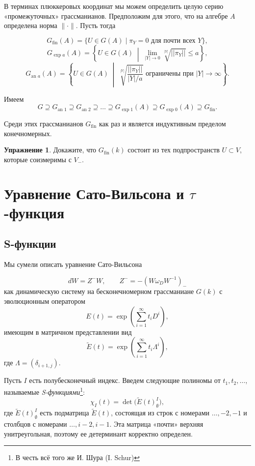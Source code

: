 \documentclass{article}
\theoremstyle{definition}
\theoremstyle{definition} %
\theoremstyle{remark}     %
\theoremstyle{definition}
\theoremstyle{definition}
\theoremstyle{definition}
\theoremstyle{definition}
\theoremstyle{definition}
\theoremstyle{definition}
\theoremstyle{definition}
\theoremstyle{definition}
\newtheorem{exercise}{Упражнение}[section]
\begin{document}
В терминах плюккеровых координат мы можем определить целую серию «промежуточных» грассманианов. Предположим для этого, что на алгебре \(A\) определена норма \(\|\cdot\|\). Пусть тогда

\[
G_{\text{fin}}(A) = \{U \in G(A) \mid \pi_Y = 0 \text{ для почти всех } Y\},
\]
\[
    G_{\exp a}(A) = \left\{U \in G(A) \;\middle|\; \lim_{|Y| \to 0} \sqrt[|Y|]{||\pi_Y||} \leq a\right\},
\]
\[
    G_{\text{an } a}(A) = \left\{U \in G(A) \;\middle|\; \sqrt[|Y|]{\frac{||\pi_Y||}{|Y|/a}} \text{ ограничены при } |Y| \to \infty\right\}.
\]

Имеем
\[
G \supseteq G_{\text{an } 1} \supseteq G_{\text{an } 2} \supseteq \dots \supseteq G_{\exp 1}(A) \supseteq G_{\exp 0}(A) \supseteq G_{\text{fin}}.
\]

Среди этих грассманианов \(G_{\text{fin}}\) как раз и является индуктивным пределом конечномерных.


\begin{exercise}
  Докажите, что \( G_{\text{fin}}(k) \) состоит из тех подпространств \( U \subset V \), которые соизмеримы с \( V_- \).
\end{exercise}


\section{Уравнение Сато-Вильсона и $\tau$-функция}
\subsection{S-функции}
Мы сумели описать уравнение Сато-Вильсона

\[
dW = Z^- W, \qquad Z^- = -(W\omega_D W^{-1})_-
\]
как динамическую систему на бесконечномерном грассманиане \( G(k) \) с эволюционным оператором
\[
E(t) = \exp\left(\sum_{i=1}^{\infty} t_i D^i\right),
\]
имеющим в матричном представлении вид
\[
\tilde{E}(t) = \exp\left(\sum_{i=1}^{\infty} t_i \Lambda^i\right),
\]
где \(\Lambda = (\delta_{i+1,j})\).

Пусть \( I \) есть полубесконечный индекс. Введем следующие полиномы от \( t_1, t_2, \dots \), называемые \textit{S-функциями}\footnote{В честь всё того же И. Шура (I. Schur)}:
\[
\chi_I(t) = \det\bigl(\tilde{E}(t)^I_{\emptyset}\bigr),
\]
где \(\tilde{E}(t)^I_{\emptyset}\) есть подматрица \(\tilde{E}(t)\), состоящая из строк с номерами \(\dots, -2, -1\) и столбцов с номерами \(\dots, i-2, i-1\). Эта матрица «почти» верхняя унитреугольная, поэтому ее детерминант корректно определен.
\end{document}
